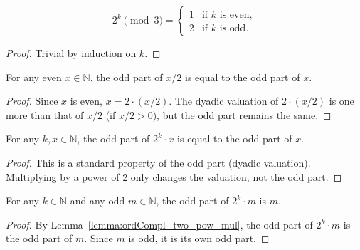 \begin{lemma}\label{lemma:pow_two_mod_three}\leanok
\begin{equation}
    2^k \pmod 3 =
    \begin{cases}
        1 & \text{if } k \text{ is even}, \\
        2 & \text{if } k \text{ is odd}.
    \end{cases}
\end{equation}
\end{lemma}
\begin{proof}\leanok
Trivial by induction on $k$.
\end{proof}

\begin{lemma}\label{lemma:ordCompl_two_div_two}\leanok
For any even $x \in \mathbb{N}$, the odd part of $x/2$ is equal to the odd part of $x$.
\end{lemma}
\begin{proof}\leanok
Since $x$ is even, $x = 2 \cdot (x/2)$. The dyadic valuation of $2 \cdot (x/2)$ is one more than that of $x/2$ (if $x/2 > 0$), but the odd part remains the same.
\end{proof}

\begin{lemma}\label{lemma:ordCompl_two_pow_mul}\leanok
For any $k, x \in \mathbb{N}$, the odd part of $2^k \cdot x$ is equal to the odd part of $x$.
\end{lemma}
\begin{proof}\leanok
This is a standard property of the odd part (dyadic valuation). Multiplying by a power of 2 only changes the valuation, not the odd part.
\end{proof}

\begin{lemma}\label{lemma:ordCompl_two_mul_pow}\leanok
For any $k \in \mathbb{N}$ and any odd $m \in \mathbb{N}$, the odd part of $2^k \cdot m$ is $m$.
\end{lemma}
\begin{proof}\leanok
By Lemma~\ref{lemma:ordCompl_two_pow_mul}, the odd part of $2^k \cdot m$ is the odd part of $m$. Since $m$ is odd, it is its own odd part.
\end{proof}

